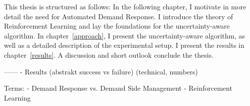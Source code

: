 This thesis is structured as follows: In the following chapter, I motivate in more detail the need for Automated Demand Response. I introduce the theory of Reinforcement Learning and lay the foundations for the uncertainty-aware algorithm.
In chapter~\ref{approach}, I present the uncertainty-aware algorithm, as well as a detailed description of the experimental setup.
I present the results in chapter~\ref{results}. A discussion and short outlook conclude the thesis.


 ------
- Results (abstrakt success vs failure) (technical, numbers)

Terms:
- Demand Response vs. Demand Side Management
- Reinforcement Learning
